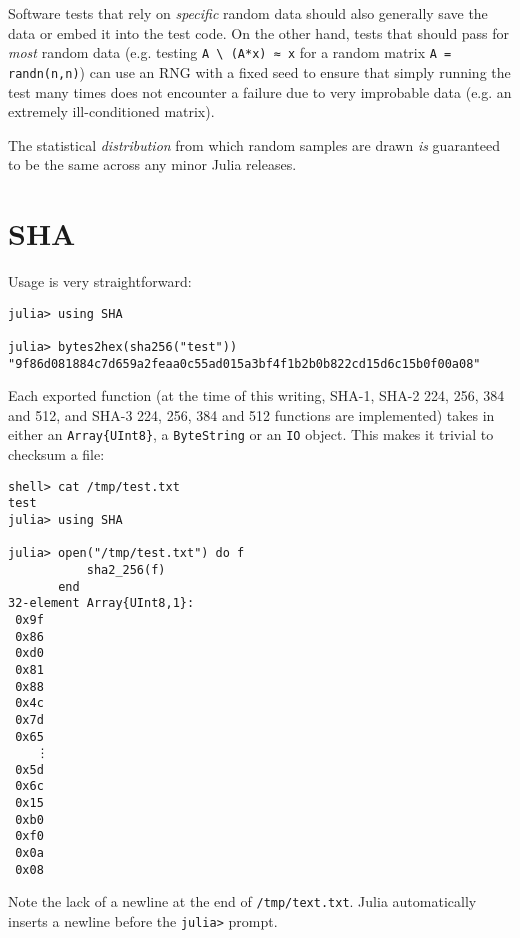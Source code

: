 Software tests that rely on \emph{specific} {\textquotedbl}random{\textquotedbl} data should also generally save the data or embed it into the test code.  On the other hand, tests that should pass for \emph{most} random data (e.g. testing \texttt{A {\textbackslash} (A*x) ≈ x} for a random matrix \texttt{A = randn(n,n)}) can use an RNG with a fixed seed to ensure that simply running the test many times does not encounter a failure due to very improbable data (e.g. an extremely ill-conditioned matrix).



The statistical \emph{distribution} from which random samples are drawn \emph{is} guaranteed to be the same across any minor Julia releases.



\hypertarget{15457917914318839048}{}


\chapter{SHA}



Usage is very straightforward:




\begin{verbatim}
julia> using SHA

julia> bytes2hex(sha256("test"))
"9f86d081884c7d659a2feaa0c55ad015a3bf4f1b2b0b822cd15d6c15b0f00a08"
\end{verbatim}



Each exported function (at the time of this writing, SHA-1, SHA-2 224, 256, 384 and 512, and SHA-3 224, 256, 384 and 512 functions are implemented) takes in either an \texttt{Array\{UInt8\}}, a \texttt{ByteString} or an \texttt{IO} object.  This makes it trivial to checksum a file:




\begin{verbatim}
shell> cat /tmp/test.txt
test
julia> using SHA

julia> open("/tmp/test.txt") do f
           sha2_256(f)
       end
32-element Array{UInt8,1}:
 0x9f
 0x86
 0xd0
 0x81
 0x88
 0x4c
 0x7d
 0x65
    ⋮
 0x5d
 0x6c
 0x15
 0xb0
 0xf0
 0x0a
 0x08
\end{verbatim}



Note the lack of a newline at the end of \texttt{/tmp/text.txt}.  Julia automatically inserts a newline before the \texttt{julia>} prompt.



